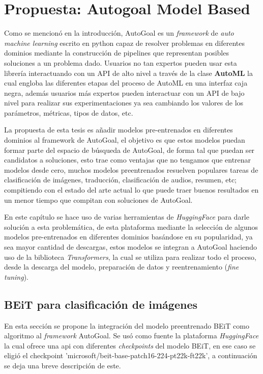 \chapter{Propuesta: Autogoal Model Based}\label{chapter:proposal}

Como se mencionó en la introducción, AutoGoal es un \textit{framework} de \textit{auto machine learning} escrito en python capaz de resolver problemas en diferentes dominios mediante la construcción de pipelines que representan posibles soluciones a un problema dado. Usuarios no tan expertos pueden usar esta librería interactuando con un API de alto nivel a través de la clase \textbf{AutoML} la cual engloba las diferentes etapas del proceso de AutoML en una interfaz caja negra, además usuarios más expertos pueden interactuar con un API de bajo nivel para realizar sus experimentaciones ya sea cambiando los valores de los parámetros, métricas, tipos de datos, etc.

La propuesta de esta tesis es añadir modelos pre-entrenados en diferentes dominios al framework de AutoGoal, el objetivo es que estos modelos puedan formar parte del espacio de búsqueda de AutoGoal, de forma tal que puedan ser candidatos a soluciones, esto trae como ventajas que no tengamos que entrenar modelos desde cero, muchos modelos preentrenados resuelven populares tareas de clasificación de imágenes, traducción, clasificación de audios, resumen, etc; compitiendo con el estado del arte actual lo que puede traer buenos resultados en un menor tiempo que compitan con soluciones de AutoGoal.

En este capítulo se hace uso de varias herramientas de \textit{HuggingFace} para darle solución a esta problemática, de esta plataforma mediante la selección de algunos modelos pre-entrenados en diferentes dominios basándose en su popularidad, ya sea mayor cantidad de descargas, estos modelos se integran a AutoGoal haciendo uso de la biblioteca \textit{Transformers}, la cual se utiliza para realizar todo el proceso, desde la descarga del modelo, preparación de datos y reentrenamiento (\textit{fine tuning}).

\section{BEiT para clasificación de imágenes}
En esta sección se propone la integración del modelo preentrenado BEiT como algoritmo al \textit{framework} AutoGoal. Se usó como fuente la plataforma \textit{HuggingFace} la cual ofrece una api con diferentes \textit{checkpoints} del modelo BEiT, en ese caso se eligió el checkpoint 'microsoft/beit-base-patch16-224-pt22k-ft22k', a continuación se deja una breve descripción de este.

